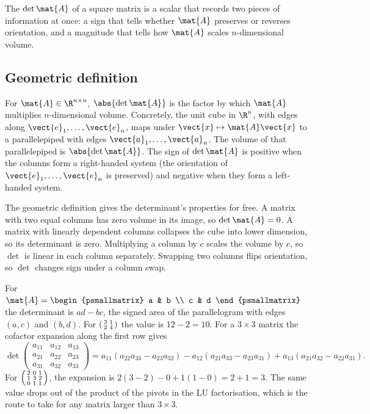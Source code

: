 The  $\det \mat{A}$ of a square matrix is a
scalar that records two pieces of information at once: a sign that
tells whether $\mat{A}$ preserves or reverses orientation, and a
magnitude that tells how $\mat{A}$ scales $n$-dimensional volume.

\subsection{Geometric definition}

For $\mat{A} \in \R^{n \times n}$, $\abs{\det \mat{A}}$ is the
factor by which $\mat{A}$ multiplies $n$-dimensional volume.
Concretely, the unit cube in $\R^{n}$, with edges along
$\vect{e}_{1}, \ldots, \vect{e}_{n}$, maps under $\vect{x} \mapsto
\mat{A}\vect{x}$ to a parallelepiped with edges $\vect{a}_{1},
\ldots, \vect{a}_{n}$. The volume of that parallelepiped is
$\abs{\det \mat{A}}$. The sign of $\det \mat{A}$ is positive when
the columns form a right-handed system (the orientation of
$\vect{e}_{1}, \ldots, \vect{e}_{n}$ is preserved) and negative
when they form a left-handed system.

The geometric definition gives the determinant's properties for
free. A matrix with two equal columns has zero volume in its image,
so $\det \mat{A} = 0$. A matrix with linearly dependent columns
collapses the cube into lower dimension, so its determinant is
zero. Multiplying a column by $c$ scales the volume by $c$, so
$\det$ is linear in each column separately. Swapping two columns
flips orientation, so $\det$ changes sign under a column swap.

\begin{example}
For $\mat{A} = \begin{psmallmatrix} a & b \\ c & d \end{psmallmatrix}$
the determinant is $ad - bc$, the signed area of the parallelogram
with edges $(a, c)$ and $(b, d)$. For
$\begin{psmallmatrix} 3 & 1 \\ 2 & 4 \end{psmallmatrix}$ the value is
$12 - 2 = 10$. For a $3 \times 3$ matrix the cofactor expansion along
the first row gives
\[
\det \begin{pmatrix} a_{11} & a_{12} & a_{13} \\ a_{21} & a_{22} &
a_{23} \\ a_{31} & a_{32} & a_{33} \end{pmatrix}
= a_{11}(a_{22}a_{33} - a_{23}a_{32}) - a_{12}(a_{21}a_{33} -
a_{23}a_{31}) + a_{13}(a_{21}a_{32} - a_{22}a_{31}).
\]
For $\begin{psmallmatrix} 2 & 0 & 1 \\ 1 & 3 & 2 \\ 0 & 1 & 1
\end{psmallmatrix}$, the expansion is $2(3 - 2) - 0 + 1(1 - 0) = 2 +
1 = 3$. The same value drops out of the product of the pivots in the
LU factorisation, which is the route to take for any matrix larger
than $3 \times 3$.
\end{example}

